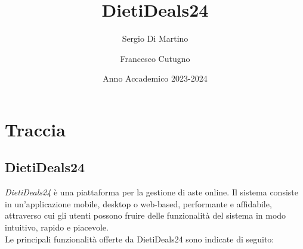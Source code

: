 \title{DietiDeals24}
\author{Sergio Di Martino \and Francesco Cutugno}
\date{Anno Accademico 2023-2024}

\chapter*{Traccia}
    \section*{DietiDeals24}
        \textit{DietiDeals24} è una piattaforma per la gestione di aste online. Il sistema consiste in un’applicazione mobile, desktop o web-based, performante e affidabile, attraverso cui gli utenti possono fruire delle funzionalità del sistema in modo intuitivo, rapido e piacevole.\\
        Le principali funzionalità offerte da DietiDeals24 sono indicate di seguito:
